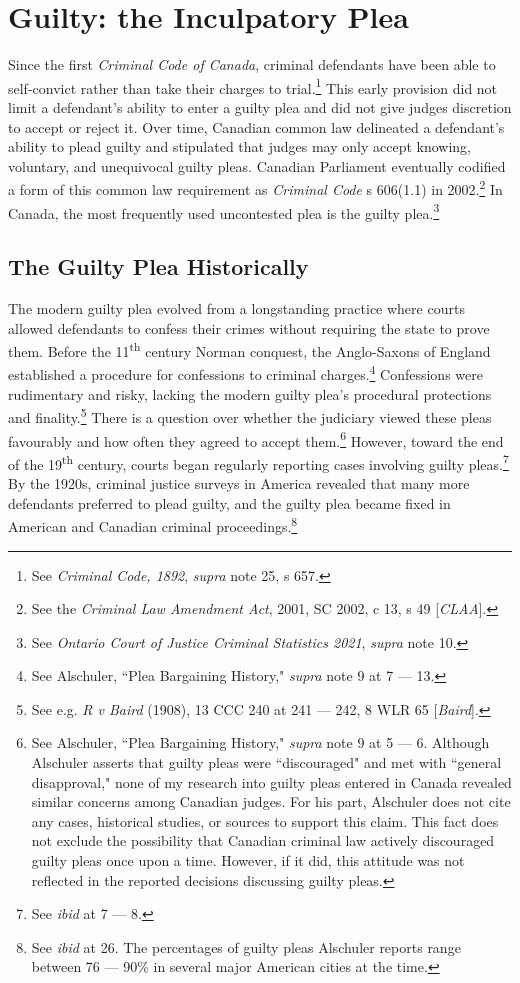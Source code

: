 \section{Guilty: the Inculpatory Plea}

Since the first \textit{Criminal Code of Canada}, criminal defendants have been able to self-convict rather than take their charges to trial.\footnote{See \textit{Criminal Code, 1892}, \textit{supra} note 25, s 657.} This early provision did not limit a defendant's ability to enter a guilty plea and did not give judges discretion to accept or reject it. Over time, Canadian common law delineated a defendant's ability to plead guilty and stipulated that judges may only accept knowing, voluntary, and unequivocal guilty pleas. Canadian Parliament eventually codified a form of this common law requirement as \textit{Criminal Code} s 606(1.1) in 2002.\footnote{See the \textit{Criminal Law Amendment Act}, 2001, SC 2002, c 13, s 49 [\textit{CLAA}].} In Canada, the most frequently used uncontested plea is the guilty plea.\footnote{See \textit{Ontario Court of Justice Criminal Statistics 2021}, \textit{supra} note 10.}

\subsection{The Guilty Plea Historically}

The modern guilty plea evolved from a longstanding practice where courts allowed defendants to confess their crimes without requiring the state to prove them. Before the 11\textsuperscript{th} century Norman conquest, the Anglo-Saxons of England established a procedure for confessions to criminal charges.\footnote{See Alschuler, ``Plea Bargaining History," \textit{supra} note 9 at 7 — 13.} Confessions were rudimentary and risky, lacking the modern guilty plea's procedural protections and finality.\footnote{See e.g. \textit{R v Baird} (1908), 13 CCC 240 at 241 — 242, 8 WLR 65 [\textit{Baird}].} There is a question over whether the judiciary viewed these pleas favourably and how often they agreed to accept them.\footnote{See Alschuler, ``Plea Bargaining History," \textit{supra} note 9 at 5 — 6. Although Alschuler asserts that guilty pleas were ``discouraged" and met with ``general disapproval," none of my research into guilty pleas entered in Canada revealed similar concerns among Canadian judges. For his part, Alschuler does not cite any cases, historical studies, or sources to support this claim. This fact does not exclude the possibility that Canadian criminal law actively discouraged guilty pleas once upon a time. However, if it did, this attitude was not reflected in the reported decisions discussing guilty pleas.} However, toward the end of the 19\textsuperscript{th} century, courts began regularly reporting cases involving guilty pleas.\footnote{See \textit{ibid} at 7 — 8.} By the 1920s, criminal justice surveys in America revealed that many more defendants preferred to plead guilty, and the guilty plea became fixed in American and Canadian criminal proceedings.\footnote{See \textit{ibid} at 26. The percentages of guilty pleas Alschuler reports range between 76 — 90\% in several major American cities at the time.}

